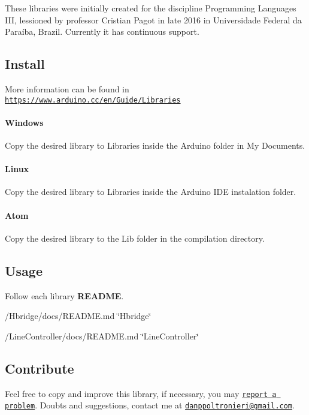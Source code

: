 These libraries were initially created for the discipline Programming Languages I\+II, lessioned by professor Cristian Pagot in late 2016 in Universidade Federal da Paraíba, Brazil. Currently it has continuous support.

\subsection*{Install}

More information can be found in \href{https://www.arduino.cc/en/Guide/Libraries}{\tt https\+://www.\+arduino.\+cc/en/\+Guide/\+Libraries} \paragraph*{Windows}

Copy the desired library to {\ttfamily Libraries} inside the {\ttfamily Arduino} folder in {\ttfamily My Documents}.

\paragraph*{Linux}

Copy the desired library to {\ttfamily Libraries} inside the Arduino I\+DE instalation folder.

\paragraph*{Atom}

Copy the desired library to the {\ttfamily Lib} folder in the compilation directory.

\subsection*{Usage}

Follow each library {\bfseries R\+E\+A\+D\+ME}.
\begin{DoxyItemize}
\item /\+Hbridge/docs/\+R\+E\+A\+D\+ME.md \char`\"{}\+Hbridge\char`\"{}
\item /\+Line\+Controller/docs/\+R\+E\+A\+D\+ME.md \char`\"{}\+Line\+Controller\char`\"{}
\end{DoxyItemize}

\subsection*{Contribute}

Feel free to copy and improve this library, if necessary, you may \href{https://github.com/dpoltronieri/Arduino/issues/new}{\tt report a problem}. Doubts and suggestions, contact me at \href{mailto:danppoltronieri@gmail.com}{\tt danppoltronieri@gmail.\+com}.


